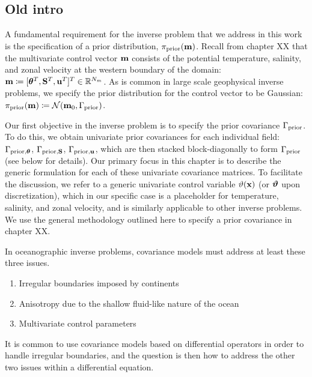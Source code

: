 \subsection{Old intro}
A fundamental requirement for the inverse problem that we address in this work
is the specification of a prior distribution, $\pi_{\text{prior}}(\mathbf{m})$.
Recall from chapter XX that the multivariate control vector
$\mathbf{m}$ consists of the
potential temperature, salinity, and zonal velocity at the western boundary of
the domain:
$\mathbf{m} \coloneqq [{\bm{\theta}}^T,\mathbf{S}^T,\mathbf{u}^T]^T \in\mathbb{R}^{N_m}$.
As is common in large scale geophysical inverse problems, we specify the prior
distribution for the control vector
to be Gaussian: $\pi_{\text{prior}}(\mathbf{m}) \coloneqq \mathcal{N}(\mathbf{m}_0, \Gamma_{\text{prior}})$.

Our first objective in the inverse problem is to specify the prior
covariance $\Gamma_{\text{prior}}$.
To do this, we obtain univariate prior covariances for
each individual field: $\Gamma_{\text{prior,}{\bm{\theta}}}$, $\Gamma_{\text{prior,}\mathbf{S}}$,
$\Gamma_{\text{prior,}\mathbf{u}}$, which are then stacked block-diagonally to form
$\Gamma_{\text{prior}}$ (see below for details).
Our primary focus in this chapter is to describe the generic formulation for
each of these univariate covariance matrices.
To facilitate the discussion, we refer to a generic univariate control variable
$\vartheta(\mathbf{x})$ (or $\bm{\vartheta}$ upon discretization), which in our specific case is a
placeholder for temperature, salinity, and zonal velocity, and is similarly
applicable to other inverse problems.
We use the general methodology outlined here to specify a prior covariance in
chapter XX.

In oceanographic inverse problems, covariance models must address at least
these three issues.
\begin{enumerate}
    \item Irregular boundaries imposed by continents
    \item Anisotropy due to the shallow fluid-like nature of the ocean
    \item Multivariate control parameters
\end{enumerate}
It is common to use covariance models based on differential operators in order
to handle irregular boundaries, and the question is then how to address the
other two issues within a differential equation.

